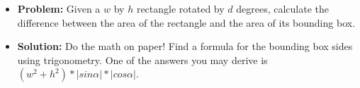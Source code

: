 \begin{frame}
    \frametitle{\problemtitle}
    \begin{itemize}
        \item<+-> \textbf{Problem:} Given a $w$ by $h$ rectangle rotated by $d$ degrees, calculate the difference between the area of the rectangle and the area of its bounding box.
        \item<+-> \textbf{Solution:} Do the math on paper! Find a formula for the bounding box sides using trigonometry. One of the answers you may derive is $(w^2+h^2)*|sin\alpha|*|cos\alpha|$.
    \end{itemize}
\end{frame}
